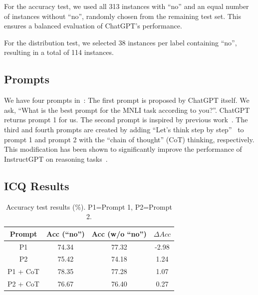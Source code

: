 For the accuracy test, we used all 313 instances 
with ``no'' and an equal number of instances without 
``no'', randomly chosen from the remaining test set. 
This ensures a balanced evaluation of ChatGPT's performance.

For the distribution test, we selected 38 
instances per label containing ``no'', 
resulting in a total of 114 instances. 

\subsection{Prompts}
We have four prompts in~:
The first prompt is proposed by ChatGPT itself. 
We ask, ``What is the best prompt for the MNLI task according to you?''. 
ChatGPT returns prompt 1 for us. 
The second prompt is inspired by previous work~\cite{qin2023chatgpt}.
The third and fourth prompts are created by adding ``Let's think step by step''~\cite{kojima2022large}
to prompt 1 and prompt 2 with the ``chain of thought'' (CoT) thinking, respectively. 
This modification has been shown to significantly improve 
the performance of InstructGPT on reasoning tasks~\cite{ouyang2022training}.

\subsection{ICQ Results}
\label{sec:chatgptacc}
%

\begin{table}[th]
\centering
\scriptsize
\begin{tabular}{c|ccc}
\toprule
\textbf{Prompt} & Acc (``no'') & Acc (w/o ``no'') & $\Delta Acc$ \\ \midrule
P1  & 74.34& 77.32& -2.98   \\ \hline
P2&  75.42& 74.18 & 1.24 \\ \hline
P1 + CoT  & 78.35& 77.28&1.07  \\ \hline
P2 + CoT&  76.67& 76.40&  0.27 \\ \hline
 \bottomrule
\end{tabular}
\caption{Accuracy test results (\%). P1=Prompt 1, P2=Prompt 2.}
\label{tab:accuracy}
\end{table}


